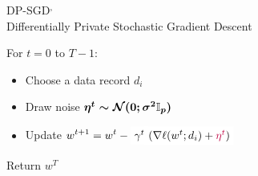 \documentclass[17pt,aspectratio=169]{beamer}
\begin{document}
\begin{frame}{DP-SGD$^{,\hspace{0.1em}}$\\[-0.5em]\normalsize Differentially Private Stochastic Gradient Descent}


    \small
    For $t = 0$ to $T-1$:
    \begin{itemize}
    \item Choose a data record $d_i$
    \item Draw noise \textcolor{purple}{$\boldsymbol{\eta^t \sim \mathcal N(0; \sigma^2\mathbb I_p)}$}
    \item Update
      $\displaystyle w^{t+1}
      = w^t -
      \tikz[baseline,remember picture]{\node[fill=red!0,anchor=base] (step){$\gamma^t$};}
      \!\!
      \tikz[baseline,remember picture]{\node[fill=blue!0,anchor=base]
        (grad){$(\nabla\ell( w^t; d_i ) + \textcolor{purple}{\eta^t})$};}
      $
    \end{itemize}
    Return $w^T$





  \vspace{1em}
\end{frame}
\end{document}
